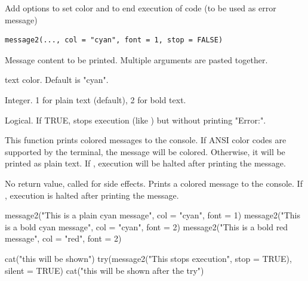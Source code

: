 \documentclass[a4paper]{book}
\begin{document}
%
\begin{Description}
Add options to set color and to end execution of code (to be used as error message)
\end{Description}
%
\begin{Usage}
\begin{verbatim}
message2(..., col = "cyan", font = 1, stop = FALSE)
\end{verbatim}
\end{Usage}
%
\begin{Arguments}
\begin{ldescription}
\item[\code{...}] Message content to be printed. Multiple arguments are pasted together.

\item[\code{col}] text color. Default is "cyan".

\item[\code{font}] Integer. 1 for plain text (default), 2 for bold text.

\item[\code{stop}] Logical. If TRUE, stops execution (like ) but without printing "Error:".
\end{ldescription}
\end{Arguments}
%
\begin{Details}
This function prints colored messages to the console. If ANSI color codes are supported
by the terminal, the message will be colored. Otherwise, it will be printed as plain text.
If , execution will be halted after printing the message.
\end{Details}
%
\begin{Value}
No return value, called for side effects. Prints a colored message 
to the console. If , execution is halted after printing 
the message.
\end{Value}
%
\begin{Examples}
\begin{ExampleCode}
message2("This is a plain cyan message", col = "cyan", font = 1)
message2("This is a bold cyan message", col = "cyan", font = 2)
message2("This is a bold red message", col = "red", font = 2)

cat("this will be shown")
try(message2("This stops execution", stop = TRUE), silent = TRUE)
cat("this will be shown after the try")


\end{ExampleCode}
\end{Examples}
\end{document}

